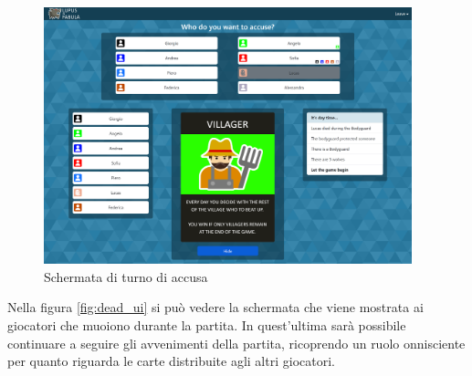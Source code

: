 \begin{figure}[H]
\begin{minipage}{0.25\textwidth}
    \end{minipage}\hfill
    \begin{minipage}{0.75\textwidth}
        \centering
        \includegraphics[width=0.95\textwidth]{img/screen/desktop/accusation_desktop.png}
    \end{minipage}
    \caption{Schermata di turno di accusa}
    \label{fig:accusation_ui}
\end{figure}

Nella figura \ref{fig:dead_ui} si può vedere la schermata che viene mostrata ai giocatori che muoiono durante la partita. In quest'ultima sarà possibile continuare a seguire gli avvenimenti della partita, ricoprendo un ruolo onnisciente per quanto riguarda le carte distribuite agli altri giocatori.

